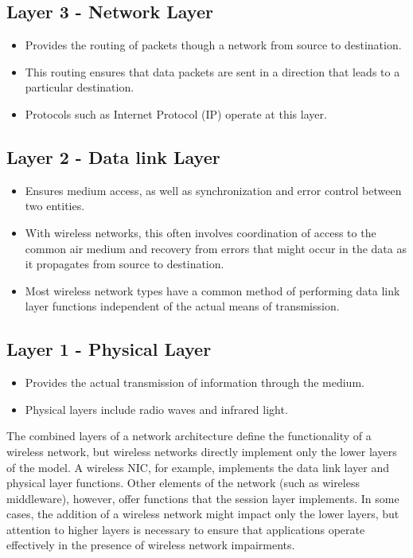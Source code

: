 \subsection*{Layer 3 - Network Layer}
\begin{itemize}
	\item Provides the routing of packets though a network from source to destination. 
	\item This routing ensures that data packets are sent in a direction that leads to a particular destination. 
	\item Protocols such as Internet Protocol (IP) operate at this layer.
\end{itemize}


\subsection*{Layer 2 - Data link Layer}
\begin{itemize}
	\item Ensures medium access, as well as synchronization and error control between two entities. 
	\item With wireless networks, this often involves coordination of access to the common air medium and recovery from errors that might occur in the data as it propagates from source to destination. 
	\item Most wireless network types have a common method of performing data link layer functions independent of the actual means of transmission.
\end{itemize}


\subsection*{Layer 1 - Physical Layer}
\begin{itemize}
	\item Provides the actual transmission of information through the medium. 
	\item Physical layers include radio waves and infrared light. 
\end{itemize}

\noindent The combined layers of a network architecture define the functionality of a wireless network, but wireless networks directly implement only the lower layers of the model. A wireless NIC, for example, implements the data link layer and physical layer functions. Other elements of the network (such as wireless middleware), however, offer functions that the session layer implements. In some cases, the addition of a wireless network might impact only the lower layers, but attention to higher layers is necessary to ensure that applications operate effectively in the presence of wireless network impairments. 

